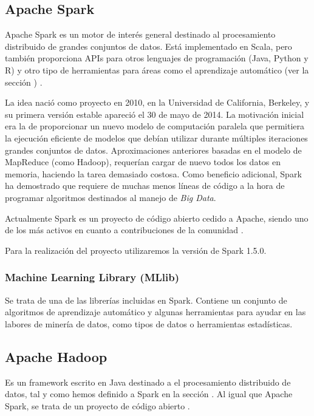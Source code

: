 \subsection{Apache Spark}\label{sec:DefSpark}

Apache Spark es un motor de interés general destinado al procesamiento distribuido de grandes conjuntos de datos. Está implementado en Scala, pero también proporciona APIs para otros lenguajes de programación (Java, Python y R) y otro tipo de herramientas para áreas como el aprendizaje automático (ver la sección ) \cite{SparkDoc}.

La idea nació como proyecto en 2010, en la Universidad de California, Berkeley, y su primera versión estable apareció el 30 de mayo de 2014. La motivación inicial era la de proporcionar un nuevo modelo de computación paralela que permitiera la ejecución eficiente de modelos que debían utilizar durante múltiples iteraciones grandes conjuntos de datos. Aproximaciones anteriores basadas en el modelo de MapReduce (como Hadoop), requerían cargar de nuevo todos los datos en memoria, haciendo la tarea demasiado costosa\cite{SparkPaper}. Como beneficio adicional, Spark ha demostrado que requiere de muchas menos líneas de código a la hora de programar algoritmos destinados al manejo de \textit{Big Data}.

Actualmente Spark es un proyecto de código abierto cedido a Apache, siendo uno de los más activos en cuanto a contribuciones de la comunidad \cite{ApacheContributions}. 

Para la realización del proyecto utilizaremos la versión de Spark 1.5.0.

\subsubsection{Machine Learning Library (MLlib)}\label{MLib}

Se trata de una de las librerías incluidas en Spark. Contiene un conjunto de algoritmos de aprendizaje automático y algunas herramientas para ayudar en las labores de minería de datos, como tipos de datos o herramientas estadísticas.  

\subsection{Apache Hadoop}
Es un framework escrito en Java destinado a el procesamiento distribuido de datos, tal y como hemos definido a Spark en la sección  . Al igual que Apache Spark, se trata de un proyecto de código abierto \cite{HadoopPage}.


